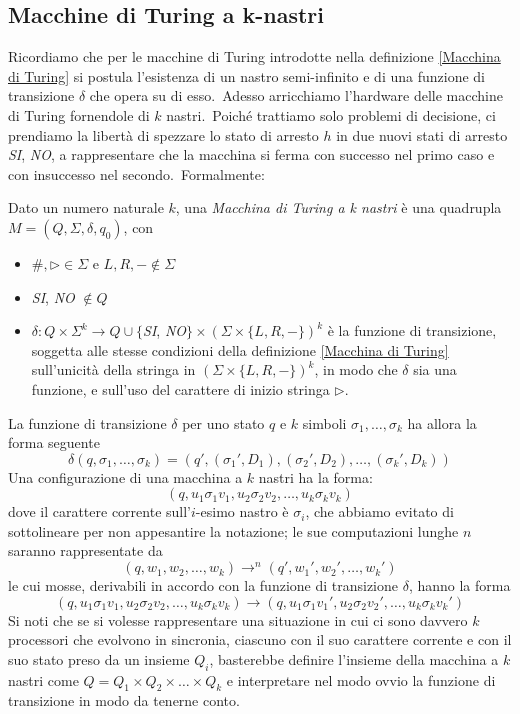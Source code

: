 \subsection{Macchine di Turing a k-nastri}

Ricordiamo che per le macchine di Turing introdotte nella definizione \ref{Macchina di Turing} si postula l'esistenza di un nastro semi-infinito e di una funzione di transizione $\delta$ che opera su di esso.\
Adesso arricchiamo l'hardware delle macchine di Turing fornendole di $k$ nastri.\
Poiché trattiamo solo problemi di decisione, ci prendiamo la libertà di spezzare lo stato di arresto $h$ in due nuovi stati di arresto \textit{\footnotesize SI}, \textit{\footnotesize NO}, a rappresentare che la macchina si ferma con successo nel primo caso e con insuccesso nel secondo.\
Formalmente:

\begin{definition} 
    \label{MdT_k-nastri}
    Dato un numero naturale $k$, una \textit{Macchina di Turing a k nastri} è una quadrupla $M = (Q, \Sigma, \delta, q_0)$, con
    \begin{itemize}
        \item $\#, \triangleright \in \Sigma$ e $L, R, - \notin \Sigma$
        \item \textit{\footnotesize SI}, \textit{\footnotesize NO} $\notin Q$
        \item$\delta : Q \times \Sigma^k \rightarrow Q \cup \{$\textit{\footnotesize SI}, \textit{\footnotesize NO}$\} \times (\Sigma \times \{L,R,-\})^k$ è la funzione di transizione, soggetta alle stesse condizioni della definizione \ref{Macchina di Turing} sull'unicità della stringa in $(\Sigma \times \{ L,R, -\})^k$, in modo che $\delta$ sia una funzione, e sull'uso del carattere di inizio stringa $\triangleright$.
    \end{itemize}
\end{definition}

\noindent La funzione di transizione $\delta$ per uno stato $q$ e $k$ simboli $\sigma_1, \dots, \sigma_k$ ha allora la forma seguente
\[\delta (q,\sigma_1, \dots,\sigma_k) = (q', (\sigma_1', D_1), (\sigma_2', D_2), \dots, (\sigma_k', D_k))\]
Una configurazione di una macchina a $k$ nastri ha la forma:
\[(q, u_1 \sigma_1 v_1, u_2 \sigma_2 v_2 , \dots, u_k \sigma_k v_k)\]
dove il carattere corrente sull'$i$-esimo nastro è $\sigma_i$, che abbiamo evitato di sottolineare per non appesantire la notazione; le sue computazioni lunghe $n$ saranno rappresentate da
\[(q, w_1 , w_2, \dots, w_k) \rightarrow^n (q', w_1', w_2', \dots, w_k')\]
le cui mosse, derivabili in accordo con la funzione di transizione $\delta$, hanno la forma
\[(q, u_1 \sigma_1 v_1, u_2 \sigma_2 v_2 , \dots, u_k \sigma_k v_k) \rightarrow (q, u_1 \sigma_1 v_1', u_2 \sigma_2 v_2', \dots, u_k\sigma_k v_k')\]
Si noti che se si volesse rappresentare una situazione in cui ci sono davvero $k$ processori che evolvono in sincronia, ciascuno con il suo carattere corrente e con il suo stato preso da un insieme $Q_i$, basterebbe definire l'insieme della macchina a $k$ nastri come $Q = Q_1 \times Q_2 \times \dots \times Q_k$ e interpretare nel modo ovvio la funzione di transizione in modo da tenerne conto.\

